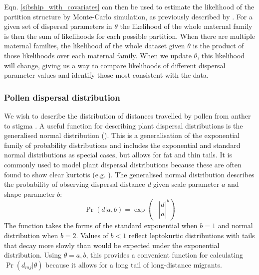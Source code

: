 \documentclass[10pt, a4paper, twocolumn]{article} %
\begin{document}
Eqn. \ref{sibship_with_covariates} can then be used to estimate the likelihood of the partition structure by Monte-Carlo simulation, as previously described by \textcite{ellis2018efficient}.
For a given set of dispersal parameters in $\theta$ the likelihood of the whole maternal family is then the sum of likelihoods for each possible partition. When there are multiple maternal families, the likelihood of the whole dataset given $\theta$ is the product of those likelihoods over each maternal family. When we update $\theta$, this likelihood will change, giving us a way to compare likelihoods of different dispersal parameter values and identify those most consistent with the data.

\subsubsection{Pollen dispersal distribution}

We wish to describe the distribution of distances travelled by pollen from anther to stigma \citep{nathan2012dispersal}.
A useful function for describing plant dispersal distributions is the generalised normal distribution (\cite{clark1998trees,Nadarajah2005,kremer2012long}). This is a generalisation of the exponential family of probability distributions and includes the exponential and standard normal distributions as special cases, but allows for fat and thin tails. It is commonly used to model plant dispersal distributions because these are often found to show clear kurtotis (e.g. \cite{austerlitz2004using, robledo2005patterns, klein2008pollen, burczyk2019patterns, field2011importance, ottewell2012pollen}). The generalised normal distribution describes the probability of observing dispersal distance \textit{d} given scale parameter $a$ and shape parameter $b$:
\begin{equation}
\Pr(d|a,b) = \exp{  (-|\frac{d}{a}| ^b) }
\label{eqn:GND}
\end{equation}
The function takes the forms of the standard exponential when $b=1$ and normal distribution when $b=2$. Values of $b<1$ reflect leptokurtic distributions with tails that decay more slowly than would be expected under the exponential distribution. Using $\theta={a,b}$, this provides a convenient function for calculating $\Pr(d_{mj} | \theta)$ because it allows for a long tail of long-distance migrants.
\end{document}
